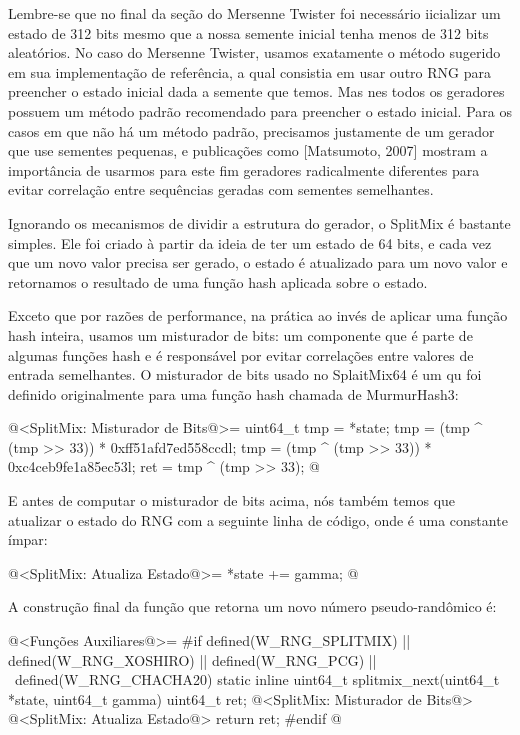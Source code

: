 Lembre-se que no final da seção do Mersenne Twister foi necessário
iicializar um estado de 312 bits mesmo que a nossa semente inicial
tenha menos de 312 bits aleatórios. No caso do Mersenne Twister,
usamos exatamente o método sugerido em sua implementação de
referência, a qual consistia em usar outro RNG para preencher o estado
inicial dada a semente que temos. Mas nes todos os geradores possuem
um método padrão recomendado para preencher o estado inicial. Para os
casos em que não há um método padrão, precisamos justamente de um
gerador que use sementes pequenas, e publicações como [Matsumoto,
2007] mostram a importância de usarmos para este fim geradores
radicalmente diferentes para evitar correlação entre sequências
geradas com sementes semelhantes.

Ignorando os mecanismos de dividir a estrutura do gerador, o SplitMix
é bastante simples. Ele foi criado à partir da ideia de ter um estado
de 64 bits, e cada vez que um novo valor precisa ser gerado, o estado
é atualizado para um novo valor e retornamos o resultado de uma função
hash aplicada sobre o estado.

Exceto que por razões de performance, na prática ao invés de aplicar
uma função hash inteira, usamos um misturador de bits: um componente
que é parte de algumas funções hash e é responsável por evitar
correlações entre valores de entrada semelhantes. O misturador de bits
usado no SplaitMix64 é um qu foi definido originalmente para uma
função hash chamada de MurmurHash3:

\iniciocodigo
@<SplitMix: Misturador de Bits@>=
{
  uint64_t tmp = *state;
  tmp = (tmp ^ (tmp >> 33)) * 0xff51afd7ed558ccdl;
  tmp = (tmp ^ (tmp >> 33)) * 0xc4ceb9fe1a85ec53l;
  ret = tmp ^ (tmp >> 33);
} 
@
\fimcodigo

E antes de computar o misturador de bits acima, nós também temos que
atualizar o estado do RNG com a seguinte linha de código,
onde  é uma constante ímpar:

\iniciocodigo
@<SplitMix: Atualiza Estado@>=
{
  *state +=  gamma;
} 
@
\fimcodigo

A construção final da função que retorna um novo número
pseudo-randômico é:

\iniciocodigo
@<Funções Auxiliares@>=
#if defined(W_RNG_SPLITMIX) || defined(W_RNG_XOSHIRO) || defined(W_RNG_PCG) || \
  defined(W_RNG_CHACHA20)
static inline uint64_t splitmix_next(uint64_t *state, uint64_t gamma){
  uint64_t ret;
  @<SplitMix: Misturador de Bits@>
  @<SplitMix: Atualiza Estado@>
  return ret;
}
#endif
@
\fimcodigo

